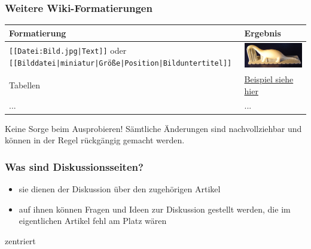 \documentclass{beamer}              %
\begin{document}
\begin{frame}
  \frametitle{Weitere Wiki-Formatierungen}
  \begin{longtable}{|l|l|}
    \hline
    \textbf{Formatierung} & \textbf{Ergebnis} \\ 
    \hline
    \texttt{[[Datei:Bild.jpg|Text]]} oder \texttt{[[Bilddatei|miniatur|Größe|Position|Bilduntertitel]]}  &   \includegraphics[keepaspectratio=true, width=\textwidth]{rapid-dino.jpg} \\
    \hline
    Tabellen & \href{https://de.wikipedia.org/wiki/Hilfe:Tabellen}{Beispiel siehe hier} \\ 
    \hline
    \hline
    ... & ... \\     
    \hline
\end{longtable}

Keine Sorge beim Ausprobieren! Sämtliche Änderungen sind nachvollziehbar und können in der Regel rückgängig gemacht werden.
\end{frame}


\begin{frame}
  \frametitle{Was sind Diskussionsseiten?}

  \begin{itemize}[<+->]
    \item sie dienen der Diskussion über den zugehörigen Artikel
    \item auf ihnen können Fragen und Ideen zur Diskussion gestellt werden,
      die im eigentlichen Artikel fehl am Platz wären
  \end{itemize}

  zentriert

\end{frame}
\end{document}
